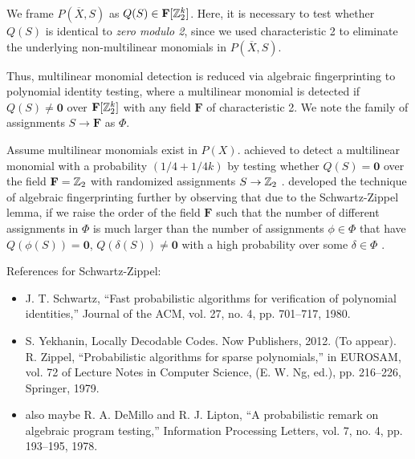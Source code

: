 \begin{problem}
\end{problem}

We frame $P(\overbar{X}, S)$ as $Q(S) \in \mathbf{F}[\mathbb Z_2^k]$. 
Here, it is necessary to test whether $Q(S)$ is identical to \emph{zero modulo 2}, 
since we used characteristic 2 to eliminate 
the underlying non-multilinear monomials in $P(\overbar{X}, S)$.

Thus, multilinear monomial detection is reduced via algebraic fingerprinting 
to polynomial identity testing, where a multilinear monomial is detected if 
$Q(S) \neq \mathbf{0}$ over $\mathbf{F}[\mathbb Z_2^k]$ with any field $\mathbf{F}$ of characteristic 2. 
We note the family of assignments $S \to \mathbf{F}$ as $\Phi$.

Assume multilinear monomials exist in $P(X)$. 
\citeauthor{Koutis08} achieved to detect a multilinear monomial 
with a probability $(1/4 + 1/{4k})$ by testing whether 
$Q(S) = \mathbf{0}$ over the field $\mathbf{F} = \mathbb Z_2$  
with randomized assignments $S \to \mathbb Z_2$ \cite{Koutis08}. 
\citeauthor{Williams09} developed the technique of algebraic fingerprinting 
further by observing that due to the Schwartz-Zippel lemma, %
if we raise the order of the field $\mathbf{F}$ 
such that the number of different assignments in $\Phi$ is much larger than 
the number of assignments $\phi \in \Phi$ that have $Q(\phi(S)) = \mathbf{0}$, 
$Q(\delta(S)) \neq \mathbf{0}$ with a high probability over some $\delta \in \Phi$ 
\cite{Williams09}. 

\begin{anamnote}[nomargin]{}
  References for Schwartz-Zippel:
  \begin{itemize}
    \item J. T. Schwartz, “Fast probabilistic algorithms for verification of
    polynomial identities,” Journal of the ACM, vol. 27, no. 4, pp. 701–717,
    1980.
    \item  S. Yekhanin, Locally Decodable Codes. Now Publishers, 2012. (To
    appear).  R. Zippel, “Probabilistic algorithms for sparse polynomials,” in
    EUROSAM, vol. 72 of Lecture Notes in Computer Science, (E. W. Ng, ed.), pp.
    216–226, Springer, 1979.
    \item also maybe  R. A. DeMillo and R. J. Lipton, “A probabilistic remark on
    algebraic program testing,” Information Processing Letters, vol. 7, no. 4,
    pp. 193–195, 1978.
    
  \end{itemize}
\end{anamnote}

